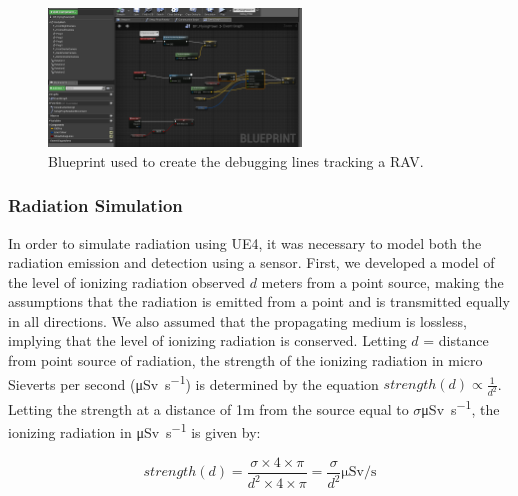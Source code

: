 \begin{figure}
    \centering
    \includegraphics[width=0.6\textwidth]{Chapters/SimulationEnv/Figs/DebuggingLines/PathTracingDebugLines.png}
    \caption{Blueprint used to create the debugging lines tracking a RAV.}
    \label{fig:DebuggingLines}
\end{figure}

\subsubsection{Radiation Simulation}
In order to simulate radiation using UE4, it was necessary to model both the radiation emission and detection using a sensor. First, we developed a model of the level of ionizing radiation observed $d$ meters from a point source, making the assumptions that the radiation is emitted from a point and is transmitted equally in all directions. We also assumed that the propagating medium is lossless, implying that the level of ionizing radiation is conserved. Letting $d$ = distance from point source of radiation, the strength of the ionizing radiation in micro Sieverts per second (\si{\micro\sievert\per\second}) is determined by the equation  $strength(d) \propto \frac{1}{d^2}$. Letting the strength at a distance of 1m from the source equal to
$\sigma$\si{\micro\sievert\per\second}, the ionizing radiation in \si{\micro\sievert\per\second} is given by:

\[strength(d) = \frac{\sigma \times 4 \times \pi}{d^2 \times 4 \times \pi} = \frac{\sigma}{d^2} \si{\micro\sievert\per\second}\]

